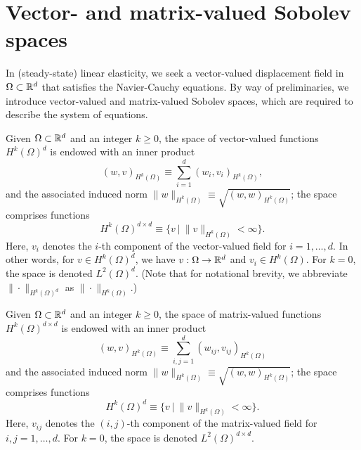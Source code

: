 \section{Vector- and matrix-valued Sobolev spaces}
In (steady-state) linear elasticity, we seek a vector-valued displacement field in $\Omega \subset \mathbb{R}^d$ that satisfies the Navier-Cauchy equations. By way of preliminaries, we introduce vector-valued and matrix-valued Sobolev spaces, which are required to describe the system of equations.
\begin{definition}
  Given $\Omega \subset \mathbb{R}^d$ and an integer $k \geq 0$, the space of vector-valued functions $H^k(\Omega)^d$ is endowed with an inner product
  \begin{equation*}
    (w,v)_{H^k(\Omega)} \equiv \sum_{i=1}^d (w_i,v_i)_{H^k(\Omega)},
  \end{equation*}
  and the associated induced norm $\| w \|_{H^k(\Omega)} \equiv \sqrt{(w,w)_{H^k(\Omega)}}$; the space comprises functions
  \begin{equation*}
    H^k(\Omega)^{d \times d} \equiv \{ v \ | \ \| v \|_{H^k(\Omega)} < \infty \}.
  \end{equation*}
  Here, $v_i$ denotes the $i$-th component of the vector-valued field for $i = 1,\dots,d$. In other words, for $v \in H^k(\Omega)^d$, we have $v: \Omega \to \mathbb{R}^d$ and $v_i \in H^k(\Omega)$.  For $k = 0$, the space is denoted $L^2(\Omega)^d$.  (Note that for notational brevity, we abbreviate $\| \cdot \|_{H^k(\Omega)^d}$ as $\| \cdot \|_{H^k(\Omega)}$.)
\end{definition}
\begin{definition}
  Given $\Omega \subset \mathbb{R}^d$ and an integer $k \geq 0$, the space of matrix-valued functions $H^k(\Omega)^{d \times d}$ is endowed with an inner product
  \begin{equation*}
    (w,v)_{H^k(\Omega)} \equiv \sum_{i,j=1}^d (w_{ij},v_{ij})_{H^k(\Omega)}
  \end{equation*}
  and the associated induced norm $\| w \|_{H^k(\Omega)} \equiv \sqrt{(w,w)_{H^k(\Omega)}}$; the space comprises functions
  \begin{equation*}
    H^k(\Omega)^d \equiv \{ v \ | \ \| v \|_{H^k(\Omega)} < \infty \}.
  \end{equation*}
  Here, $v_{ij}$ denotes the $(i,j)$-th component of the matrix-valued field for $i,j = 1,\dots,d$. For $k = 0$, the space is denoted $L^2(\Omega)^{d \times d}$.
\end{definition}
